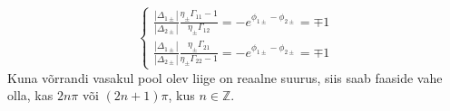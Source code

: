 \documentclass[class=article, crop=false]{standalone}
\begin{document}
\begin{equation}\label{key}
	\begin{cases}
		\frac{\left| \Delta_{ 1 \pm} \right|}{ \left| \Delta_{ 2 \pm} \right|} \frac{ \eta_{ \pm} \Gamma_{11} - 1}{ \eta_{ \pm} \Gamma_{12}} = - e^{ \phi_{ 1 \pm} - \phi_{ 2 \pm}} = \mp 1 \\
		\frac{\left| \Delta_{ 1 \pm} \right|}{ \left| \Delta_{ 2 \pm} \right|} \frac{ \eta_{ \pm} \Gamma_{21}}{ \eta_{ \pm} \Gamma_{22} - 1} = - e^{ \phi_{ 1 \pm} - \phi_{ 2 \pm}} = \mp 1
	\end{cases}
\end{equation}
Kuna võrrandi vasakul pool olev liige on reaalne suurus, siis saab faaside vahe olla, kas $ 2n \pi $ või $ (2n + 1) \pi $, kus $ n \in \mathbb{Z} $. 
\end{document}
